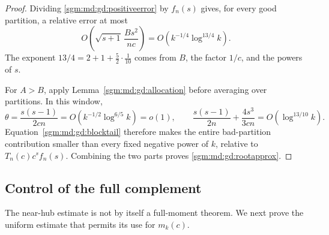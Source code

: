 \documentclass[11pt,letterpaper]{article}
\theoremstyle{remark}\newtheorem{remark}[theorem]{Remark}
\theoremstyle{definition}\newtheorem{definition}[theorem]{Definition}
\begin{document}
\begin{proof}
Dividing \eqref{sgm:md:gd:positiveerror} by $f_n(s)$ gives, for every good
partition, a relative error at most
\[
 O\!\left(\sqrt{s+1}\,\frac{B s^2}{nc}\right)
 =O\!\left(k^{-1/4}\log^{13/4}k\right).
\]
The exponent $13/4=2+1+\tfrac52\cdot\tfrac1{10}$ comes from $B$,
the factor $1/c$, and the powers of $s$.

For $A>B$, apply Lemma~\ref{sgm:md:gd:allocation} before averaging over
partitions.  In this window,
\[
 \theta=\frac{s(s-1)}{2cn}=O(k^{-1/2}\log^{6/5}k)=o(1),\qquad
 \frac{s(s-1)}{2n}+\frac{4s^3}{3cn}=O(\log^{13/10}k).
\]
Equation~\eqref{sgm:md:gd:blocktail} therefore makes the entire bad-partition
contribution smaller than every fixed negative power of $k$, relative
to $T_n(c)c^sf_n(s)$.  Combining the two parts proves
\eqref{sgm:md:gd:rootapprox}.
\end{proof}

\subsection{Control of the full complement}

The near-hub estimate is not by itself a full-moment theorem.  We next
prove the uniform estimate that permits its use for $m_k(c)$.
\end{document}
